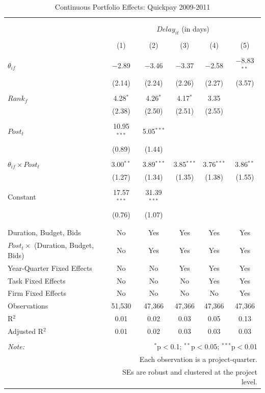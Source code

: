 \documentclass[
]{article}
\begin{document}
\begin{table}[H] \centering 
  \caption{Continuous Portfolio Effects: Quickpay 2009-2011} 
  \label{} 
\small 
\begin{tabular}{@{\extracolsep{-2pt}}lccccc} 
\\[-1.8ex]\hline 
\hline \\[-1.8ex] 
\\[-1.8ex] & \multicolumn{5}{c}{$Delay_{it}$ (in days)} \\ 
\\[-1.8ex] & (1) & (2) & (3) & (4) & (5)\\ 
\hline \\[-1.8ex] 
 $\theta_{if}$ & $-$2.89 & $-$3.46 & $-$3.37 & $-$2.58 & $-$8.83$^{**}$ \\ 
  & (2.14) & (2.24) & (2.26) & (2.27) & (3.57) \\ 
  & & & & & \\ 
 $Rank_f$ & 4.28$^{*}$ & 4.26$^{*}$ & 4.17$^{*}$ & 3.35 &  \\ 
  & (2.38) & (2.50) & (2.51) & (2.55) &  \\ 
  & & & & & \\ 
 $Post_t$ & 10.95$^{***}$ & 5.05$^{***}$ &  &  &  \\ 
  & (0.89) & (1.44) &  &  &  \\ 
  & & & & & \\ 
 $\theta_{if} \times Post_t$ & 3.00$^{**}$ & 3.89$^{***}$ & 3.85$^{***}$ & 3.76$^{***}$ & 3.86$^{**}$ \\ 
  & (1.27) & (1.34) & (1.35) & (1.38) & (1.55) \\ 
  & & & & & \\ 
 Constant & 17.57$^{***}$ & 31.39$^{***}$ &  &  &  \\ 
  & (0.76) & (1.07) &  &  &  \\ 
  & & & & & \\ 
\hline \\[-1.8ex] 
Duration, Budget, Bids & No & Yes & Yes & Yes & Yes \\ 
$Post_t \times$  (Duration, Budget, Bids) & No & Yes & Yes & Yes & Yes \\ 
Year-Quarter Fixed Effects & No & No & Yes & Yes & Yes \\ 
Task Fixed Effects & No & No & No & Yes & Yes \\ 
Firm Fixed Effects & No & No & No & No & Yes \\ 
Observations & 51,530 & 47,366 & 47,366 & 47,366 & 47,366 \\ 
R$^{2}$ & 0.01 & 0.02 & 0.03 & 0.05 & 0.13 \\ 
Adjusted R$^{2}$ & 0.01 & 0.02 & 0.03 & 0.03 & 0.03 \\ 
\hline 
\hline \\[-1.8ex] 
\textit{Note:}  & \multicolumn{5}{r}{$^{*}$p$<$0.1; $^{**}$p$<$0.05; $^{***}$p$<$0.01} \\ 
 & \multicolumn{5}{r}{Each observation is a project-quarter.} \\ 
 & \multicolumn{5}{r}{SEs are robust and clustered at the project level.} \\ 
\end{tabular} 
\end{table}
\end{document}
